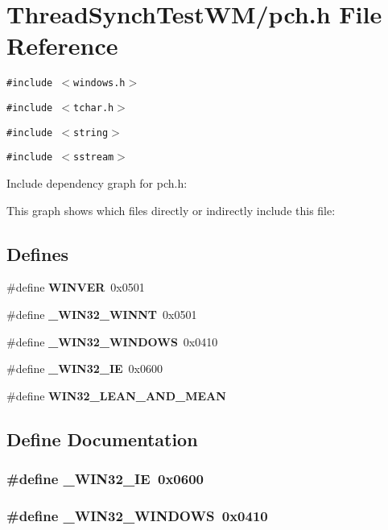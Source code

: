 \section{Thread\-Synch\-Test\-WM/pch.h File Reference}
\label{_m_2pch_8h}
{\tt \#include $<$windows.h$>$}\par
{\tt \#include $<$tchar.h$>$}\par
{\tt \#include $<$string$>$}\par
{\tt \#include $<$sstream$>$}\par


Include dependency graph for pch.h:

This graph shows which files directly or indirectly include this file:\subsection*{Defines}
\begin{CompactItemize}
\item 
\#define {\bf WINVER}~0x0501
\item 
\#define {\bf \_\-WIN32\_\-WINNT}~0x0501
\item 
\#define {\bf \_\-WIN32\_\-WINDOWS}~0x0410
\item 
\#define {\bf \_\-WIN32\_\-IE}~0x0600
\item 
\#define {\bf WIN32\_\-LEAN\_\-AND\_\-MEAN}
\end{CompactItemize}


\subsection{Define Documentation}
\subsubsection{\setlength{\rightskip}{0pt plus 5cm}\#define \_\-WIN32\_\-IE~0x0600}\label{_m_2pch_8h_d4562ce705fe4682e63dc8f1ea9dd344}


\subsubsection{\setlength{\rightskip}{0pt plus 5cm}\#define \_\-WIN32\_\-WINDOWS~0x0410}\label{_m_2pch_8h_074ca98c073d899c62fc6629918186c8}



